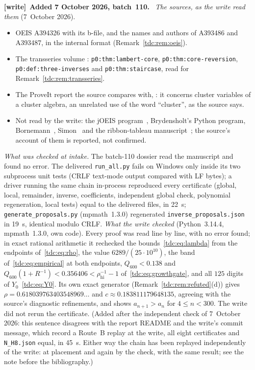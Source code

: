 \documentclass[11pt]{article}
\theoremstyle{definition}\newtheorem{definition}[theorem]{Definition}
\theoremstyle{remark}\newtheorem{remark}[theorem]{Remark}
\newcommand{\rhoh}{\rho_{\mathrm{hi}}}
\newcommand{\file}[1]{\nolinkurl{#1}}
\newenvironment{writenote}[1][]{\par\smallskip\begingroup\small
 \noindent\textbf{[write]}\if\relax\detokenize{#1}\relax\else~\textbf{#1.}\fi\ }%
 {\par\endgroup\smallskip}
\begin{document}
\begin{writenote}[Added 7 October 2026, batch~110]
\emph{The sources, as the write read them} (7~October 2026).
\begin{itemize}\raggedright
\item OEIS A394326 with its b-file, and the names and authors of A393486 and
 A393487, in the internal format (Remark~\ref{tdc:rem:oeis}).
\item The transseries volume
 :
 \file{p0:thm:lambert-core}, \file{p0:thm:core-reversion},
 \file{p0:def:three-inverses} and \file{p0:thm:staircase}, read for
 Remark~\ref{tdc:rem:transseries}.
\item The ProveIt report the source compares with,
 :
 it concerns cluster variables of a cluster algebra, an unrelated use of the
 word ``cluster'', as the source says.
\item Not read by the write: the jOEIS program~\cite{joeis}, Brydensholt's
 Python program, Bornemann~\cite{bornemann,bornemannerratum},
 Simon~\cite{simon} and the ribbon-tableau manuscript~\cite{ribboncomparison};
 the source's account of them is reported, not confirmed.
\end{itemize}

\emph{What was checked at intake.} The batch-110 dossier read the
manuscript and found no error. The delivered \file{run_all.py} fails on
Windows only inside its two subprocess unit tests (CRLF text-mode output
compared with LF bytes); a driver running the same chain in-process
reproduced every certificate (global, local, remainder, inverse,
coefficients, independent global check, polynomial regeneration, local
tests) equal to the delivered files, in 22~s; \file{generate_proposals.py}
(mpmath~1.3.0) regenerated \file{inverse_proposals.json} in 19~s, identical
modulo CRLF. \emph{What the write checked} (Python~3.14.4, mpmath~1.3.0, own
code). Every proof was read line by line, with no error found; in exact
rational arithmetic it rechecked the bounds~\eqref{tdc:eq:lambda} from the
endpoints of~\eqref{tdc:eq:rho}, the value $6289/(25\cdot10^{10})$, the band
of~\eqref{tdc:eq:empirical} at both endpoints, $Q_{600}<0.138$ and
$Q_{600}(1+R^{-1})<0.356406<\rhoh^{-1}-1$ of~\eqref{tdc:eq:growthgate}, and
all $125$ digits of $Y_0$~\eqref{tdc:eq:Y0}. Its own exact generator
(Remark~\ref{tdc:rem:refuted}(d)) gives $\rho=0.618039763403548969\ldots$ and
$c\approx0.183811179648135$, agreeing with the source's diagnostic
refinements, and shows $a_{n+1}>a_n$ for $4\le n<300$. The write did not rerun
the certificate. (Added after the independent check of 7~October 2026: this
sentence disagrees with the report README and the write's commit message,
which record a Route~B replay at the write, all eight certificates and
\file{N_H8.json} equal, in 45~s. Either way the chain has been replayed
independently of the write: at placement and again by the check, with the
same result; see the note before the bibliography.)


\end{writenote}
\end{document}
